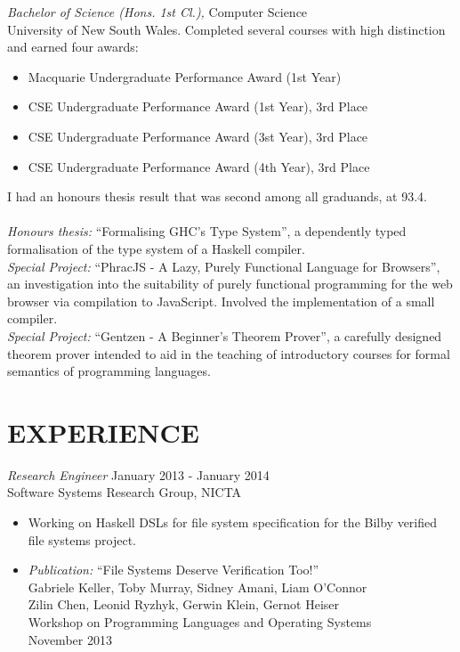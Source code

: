 \documentclass[line,margin]{res}
\begin{document}
\begin{resume}
                {\sl Bachelor of Science (Hons. 1st Cl.),} Computer Science\\
                University of New South Wales. Completed several courses with high distinction
                and earned four awards:
                \begin{itemize} \itemsep -2pt %
                    \item Macquarie Undergraduate Performance Award (1st Year)
                    \item CSE Undergraduate Performance Award (1st Year), 3rd Place
                    \item CSE Undergraduate Performance Award (3st Year), 3rd Place
                    \item CSE Undergraduate Performance Award (4th Year), 3rd Place
                \end{itemize}
                I had an honours thesis result that was second among all graduands, at 93.4.
                \\
                \\ 
                \emph{Honours thesis:} ``Formalising GHC's Type System'', a dependently typed formalisation
                of the type system of a Haskell compiler.\\
                \emph{Special Project:} ``PhracJS - A Lazy, Purely Functional Language for Browsers'', an investigation into the suitability of purely functional programming for the web browser via compilation to JavaScript.
Involved the implementation of a small compiler.          \\
                \emph{Special Project:} ``Gentzen - A Beginner's Theorem Prover'', a carefully designed theorem prover intended to aid in the teaching of introductory courses for formal semantics of programming languages.
 
\section{EXPERIENCE} {\sl Research Engineer} \hfill January 2013 - January 2014 \\
                 Software Systems Research Group, NICTA
                 \begin{itemize}  \itemsep -2pt %
                \item  Working on Haskell DSLs for file system specification
                       for the Bilby verified file systems project.
                \item \emph{Publication:} ``File Systems Deserve Verification Too!'' \\
                        \small
                          Gabriele Keller, Toby Murray, Sidney Amani, Liam O'Connor \\
                          Zilin Chen, Leonid Ryzhyk, Gerwin Klein, Gernot Heiser \\
                          Workshop on Programming Languages and Operating Systems \\
                          November 2013
                          \normalsize


\end{itemize}
\end{resume}
\end{document}
